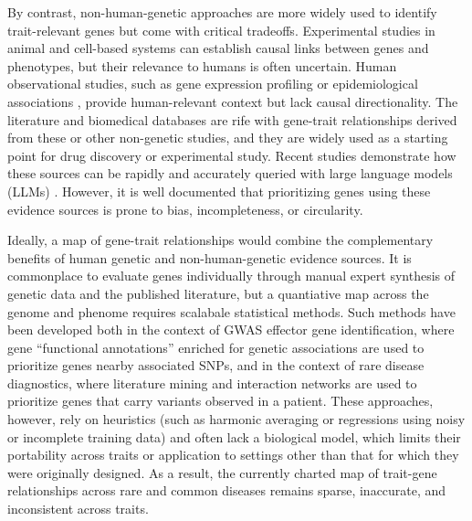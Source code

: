 \documentclass[sn-nature,lineno]{sn-jnl}%
\theoremstyle{thmstyleone}%
\theoremstyle{thmstyletwo}%
\theoremstyle{thmstylethree}%
\begin{document}
By contrast, non-human-genetic approaches are more widely used to identify trait-relevant genes but come with critical tradeoffs. Experimental studies in animal \cite{seok_genomic_2013,widjaja_inhibiting_2019} and cell-based \cite{ben-david_genetic_2018,canon_clinical_2019} systems can establish causal links between genes and phenotypes, but their relevance to humans is often uncertain. Human observational studies, such as gene expression profiling \cite{wu_integrating_2022,rodriguez_machine_2021} or epidemiological associations \cite{barter_cholesteryl_2011,bhatt_cardiovascular_2019}, provide human-relevant context but lack causal directionality. The literature and biomedical databases are rife with gene-trait relationships derived from these or other non-genetic studies, and they are widely used as a starting point for drug discovery or experimental study\cite{swinney_how_2011,dornbos_evaluating_2022}. Recent studies demonstrate how these sources can be rapidly and accurately queried with large language models (LLMs) \cite{toufiq_harnessing_2023,hu_evaluation_2025}. However, it is well documented that prioritizing genes using these evidence sources is prone to bias, incompleteness, or circularity\cite{brito_removing_2011,gillis_assessing_2013,gaudet_removing_2017,dunham_human_2018,haynes_gene_2018,stoeger_large_2018,richardson_meta_2024,tan_caution_2025}.

Ideally, a map of gene-trait relationships would combine the complementary benefits of human genetic and non-human-genetic evidence sources. It is commonplace to evaluate genes individually through manual expert synthesis of genetic data and the published literature\cite{mountjoy_open_2022,karjalainen_genome-wide_2024}, but a quantiative map across the genome and phenome requires scalabale statistical methods. Such methods have been developed both in the context of GWAS effector gene identification, where gene ``functional annotations'' enriched for genetic associations are used to prioritize genes nearby associated SNPs\cite{pers_biological_2015,weeks_leveraging_2023}, and in the context of rare disease diagnostics, where literature mining \cite{birgmeier_amelie_2020} and interaction networks\cite{smedley_next-generation_2015} are used to prioritize genes that carry variants observed in a patient. These approaches, however, rely on heuristics (such as harmonic averaging \cite{buniello_open_2025} or regressions using noisy or incomplete training data\cite{weeks_leveraging_2023,schipper_prioritizing_2025}) and often lack a biological model, which limits their portability across traits or application to settings other than that for which they were originally designed. As a result, the currently charted map of trait-gene relationships across rare and common diseases remains sparse, inaccurate, and inconsistent across traits.
\end{document}

